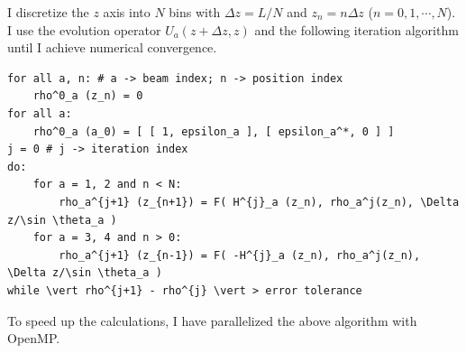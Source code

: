 I discretize the $z$ axis into $N$ bins with $\Delta z = L/N$ and $z_n=n \Delta z$ ($n=0,1,\cdots, N$). I use the evolution operator $U_a(z+\Delta z, z)$ and the following iteration algorithm until I achieve numerical convergence.
\begin{verbatim}
for all a, n: # a -> beam index; n -> position index
    rho^0_a (z_n) = 0
for all a:
    rho^0_a (a_0) = [ [ 1, epsilon_a ], [ epsilon_a^*, 0 ] ]
j = 0 # j -> iteration index
do:
    for a = 1, 2 and n < N:
        rho_a^{j+1} (z_{n+1}) = F( H^{j}_a (z_n), rho_a^j(z_n), \Delta z/\sin \theta_a )
    for a = 3, 4 and n > 0:
        rho_a^{j+1} (z_{n-1}) = F( -H^{j}_a (z_n), rho_a^j(z_n), \Delta z/\sin \theta_a )
while \vert rho^{j+1} - rho^{j} \vert > error tolerance
\end{verbatim}
To speed up the calculations, I have parallelized the above algorithm with OpenMP.


